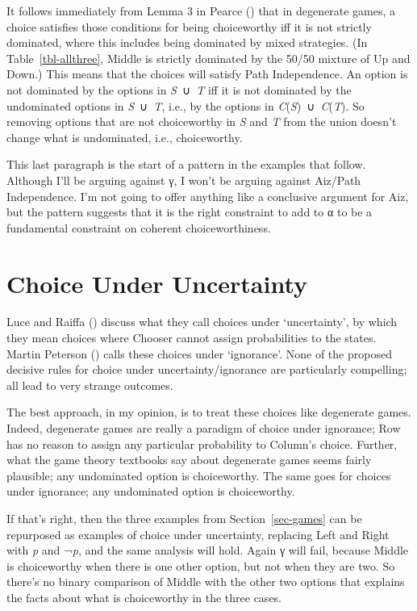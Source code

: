 \documentclass[
  11pt,
  letterpaper,
  DIV=11,
  numbers=noendperiod,
  twoside]{scrartcl}
\begin{document}
It follows immediately from Lemma 3 in Pearce
() that in degenerate games, a choice
satisfies those conditions for being choiceworthy iff it is not strictly
dominated, where this includes being dominated by mixed strategies. (In
Table~\ref{tbl-allthree}, Middle is strictly dominated by the 50/50
mixture of Up and Down.) This means that the choices will satisfy Path
Independence. An option is not dominated by the options in
\emph{S}~∪~\emph{T} iff it is not dominated by the undominated options
in \emph{S}~∪~\emph{T}, i.e., by the options in
\emph{C}(\emph{S})~∪~\emph{C}(\emph{T}). So removing options that are
not choiceworthy in \emph{S} and \emph{T} from the union doesn't change
what is undominated, i.e., choiceworthy.

This last paragraph is the start of a pattern in the examples that
follow. Although I'll be arguing against γ, I won't be arguing against
Aiz/Path Independence. I'm not going to offer anything like a conclusive
argument for Aiz, but the pattern suggests that it is the right
constraint to add to α to be a fundamental constraint on coherent
choiceworthiness.

\section{Choice Under Uncertainty}\label{sec-uncertainty}

Luce and Raiffa () discuss what they
call choices under `uncertainty', by which they mean choices where
Chooser cannot assign probabilities to the states. Martin Peterson
() calls these choices under
`ignorance'. None of the proposed decisive rules for choice under
uncertainty/ignorance are particularly compelling; all lead to very
strange outcomes.

The best approach, in my opinion, is to treat these choices like
degenerate games. Indeed, degenerate games are really a paradigm of
choice under ignorance; Row has no reason to assign any particular
probability to Column's choice. Further, what the game theory textbooks
say about degenerate games seems fairly plausible; any undominated
option is choiceworthy. The same goes for choices under ignorance; any
undominated option is choiceworthy.

If that's right, then the three examples from Section~\ref{sec-games}
can be repurposed as examples of choice under uncertainty, replacing
Left and Right with \emph{p} and ¬\emph{p}, and the same analysis will
hold. Again γ will fail, because Middle is choiceworthy when there is
one other option, but not when they are two. So there's no binary
comparison of Middle with the other two options that explains the facts
about what is choiceworthy in the three cases.
\end{document}
